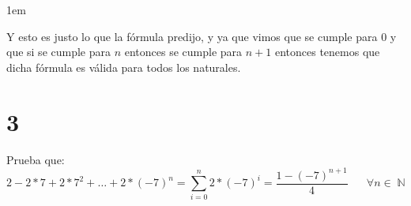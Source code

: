\documentclass[12pt, fleqn]{article}                            %
\newenvironment{SmallIndentation}[1][0.75em]                    %
        {\begin{adjustwidth}{#1}{}\begin{footnotesize}}             %
        {\end{footnotesize}\end{adjustwidth}}                       %
\DeclareMathOperator \Space     {\quad}                         %
\theoremstyle{break}                                            %
\DeclareMathOperator \Naturals     {\mathbb{N}}                 %
\begin{document}
\begin{SmallIndentation}[1em]
\begin{itemize}
            Y esto es justo lo que la fórmula predijo, y ya que vimos que se cumple
            para $0$ y que si se cumple para $n$ entonces se cumple para $n+1$ entonces
            tenemos que dicha fórmula es válida para todos los naturales.
            
        \end{itemize}

        

    \end{SmallIndentation}



\clearpage
\section{3}

    Prueba que:
    \begin{equation*}
        2 - 2*7 + 2*7^2 + \dots + 2*(-7)^n = \sum_{i=0}^n 2 * (-7)^i = \dfrac{1 - (-7)^{n+1}}{4}
        \Space \forall n \in \Naturals 
    \end{equation*}
\end{document}
